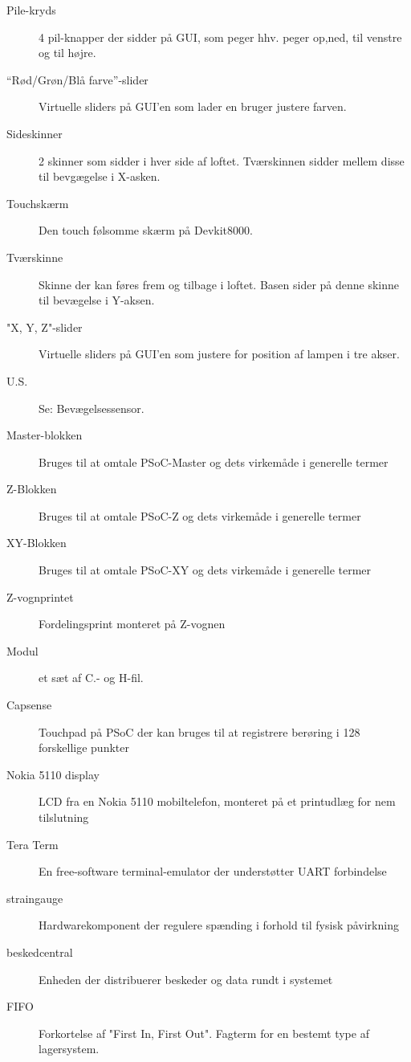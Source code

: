 \begin{description}
    \item [Pile-kryds] 4 pil-knapper der sidder på GUI, som peger hhv. peger op,ned, til venstre og til højre.
    \item [“Rød/Grøn/Blå farve”-slider] Virtuelle sliders på GUI’en som lader en bruger justere farven.
    \item [Sideskinner] 2 skinner som sidder i hver side af loftet. Tværskinnen sidder mellem disse til bevgægelse i X-asken.
    \item [Touchskærm] Den touch følsomme skærm på Devkit8000.
    \item [Tværskinne] Skinne der kan føres frem og tilbage i loftet. Basen sider på denne skinne til bevægelse i Y-aksen.
    \item ["X, Y, Z"\--slider] Virtuelle sliders på GUI'en som justere for position af lampen i tre akser.
    \item [U.S.] Se: Bevægelsessensor.
    \item [Master-blokken] Bruges til at omtale PSoC-Master og dets virkemåde i generelle termer
    \item [Z-Blokken] Bruges til at omtale PSoC-Z og dets virkemåde i generelle termer
    \item [XY-Blokken] Bruges til at omtale PSoC-XY og dets virkemåde i generelle termer
    \item [Z-vognprintet] Fordelingsprint monteret på Z-vognen
    \item [Modul] et sæt af C.- og H-fil. 
    \item [Capsense] Touchpad på PSoC der kan bruges til at registrere berøring i 128 forskellige punkter
    \item [Nokia 5110 display] LCD fra en Nokia 5110 mobiltelefon, monteret på et printudlæg for nem tilslutning
    \item [Tera Term] En free-software terminal-emulator der understøtter UART forbindelse
    \item [straingauge] Hardwarekomponent der regulere spænding i forhold til fysisk påvirkning
    \item [beskedcentral] Enheden der distribuerer beskeder og data rundt i systemet
    \item [FIFO] Forkortelse af "First In, First Out". Fagterm for en bestemt type af lagersystem.
\end{description}
